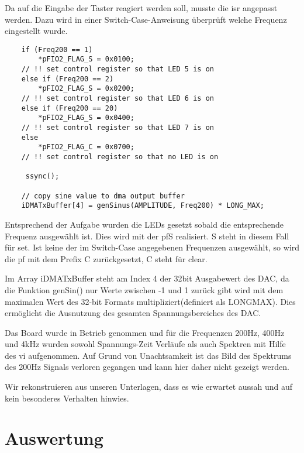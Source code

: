 Da auf die Eingabe der Taster reagiert werden soll, musste die \gls{isr} angepasst werden.
Dazu wird in einer Switch-Case-Anweisung überprüft welche Frequenz eingestellt 
wurde.\par
\begin{adjustbox}{width=\textwidth,height=\textheight,keepaspectratio}
 \begin{lstlisting}
    if (Freq200 == 1)
        *pFIO2_FLAG_S = 0x0100;
    // !! set control register so that LED 5 is on
    else if (Freq200 == 2)
        *pFIO2_FLAG_S = 0x0200;
    // !! set control register so that LED 6 is on
    else if (Freq200 == 20)
        *pFIO2_FLAG_S = 0x0400;
    // !! set control register so that LED 7 is on
    else
        *pFIO2_FLAG_C = 0x0700;
    // !! set control register so that no LED is on
    
     ssync();

    // copy sine value to dma output buffer
    iDMATxBuffer[4] = genSinus(AMPLITUDE, Freq200) * LONG_MAX;   
\end{lstlisting}
\end{adjustbox}

Entsprechend der Aufgabe wurden die LEDs gesetzt sobald die entsprechende Frequenz 
ausgewählt ist. Dies wird mit der \gls{pf}\textunderscore S realisiert. \textunderscore S steht in diesem Fall für set.
Ist keine der im Switch-Case angegebenen Frequenzen ausgewählt, so wird die \gls{pf} mit dem Prefix \textunderscore C zurückgesetzt, \textunderscore C steht für clear.

Im Array iDMATxBuffer steht am Index 4 der 32bit Ausgabewert des DAC, 
da die Funktion genSin() nur Werte zwischen -1 und 1 zurück gibt wird mit dem 
maximalen Wert des 32-bit Formats multipliziert(definiert als LONG\textunderscore MAX). 
Dies ermöglicht die Ausnutzung des gesamten Spannungsbereiches des DAC.


Das Board wurde in Betrieb genommen und für die Frequenzen 200Hz, 
400Hz und 4kHz wurden sowohl Spannungs-Zeit Verläufe als auch Spektren mit Hilfe des \gls{vi} aufgenommen. 
Auf Grund von Unachtsamkeit ist das Bild des Spektrums des 200Hz Signals verloren gegangen und kann hier daher nicht gezeigt werden.

Wir rekonstruieren aus unseren Unterlagen, dass es wie erwartet aussah und auf kein besonderes Verhalten hinwies.

\pagebreak
\section{Auswertung}



